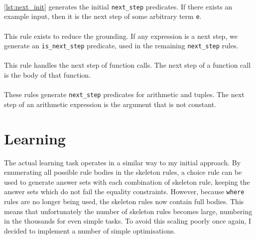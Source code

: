  
\mbox{} \\
\ref{lst:next_init} generates the initial \lstinline!next_step! predicates. If there exists an example input, then it is the next step of some arbitrary term \lstinline!e!. \\

 
\mbox{} \\
This rule exists to reduce the grounding. If any expression is a next step, we generate an \lstinline{is_next_step} predicate, used in the remaining \lstinline{next_step} rules.\\

 
\mbox{} \\
This rule handles the next step of function calls. The next step of a function call is the body of that function. \\

 
\mbox{} \\
These rules generate \lstinline{next_step} predicates for arithmetic and tuples. The next step of an arithmetic expression is the argument that is not constant. %

\section{Learning}
The actual learning task operates in a similar way to my initial approach. By enumerating all possible rule bodies in the skeleton rules, a choice rule can be used to generate answer sets with each combination of skeleton rule, keeping the answer sets which do not fail the equality constraints. However, because \lstinline!where! rules are no longer being used, the skeleton rules now contain full bodies. This means that unfortunately the number of skeleton rules becomes large, numbering in the thousands for even simple tasks. To avoid this scaling poorly once again, I decided to implement a number of simple optimisations.%

